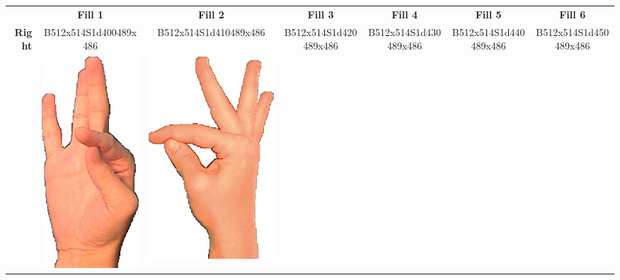 \documentclass{article}
\begin{document}
\begin{center}
\begin{tabular}{r*{6}{c}}
&\textbf{Fill 1}&\textbf{Fill 2}&\textbf{Fill 3}&\textbf{Fill 4}&\textbf{Fill 5}&\textbf{Fill 6}\\
\multirow{2}{*}{\textbf{Right}}&
B512x514S1d400489x486&
B512x514S1d410489x486&
B512x514S1d420489x486&
B512x514S1d430489x486&
B512x514S1d440489x486&
B512x514S1d450489x486\\
&
\includegraphics[scale=0.1]{images/09-02-1.jpg}&
\includegraphics[scale=0.1]{images/09-02-2.jpg}&

\end{tabular}
\end{center}
\end{document}
